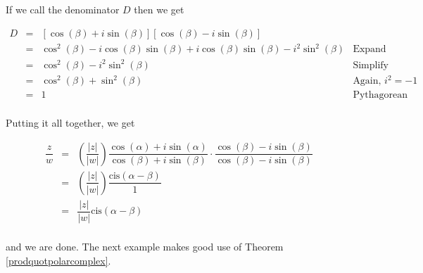 If we call the denominator $D$ then we get

\[ \begin{array}{rcll}
D & = & \left[\cos(\beta) + i\sin(\beta)\right]\left[\cos(\beta) - i\sin(\beta)\right] & \\ [3pt]
  & = & \cos^{2}(\beta) - i\cos(\beta)\sin(\beta) + i\cos(\beta)\sin(\beta) - i^2 \sin^{2}(\beta) & \text{Expand}  \\[3pt]
  & = & \cos^{2}(\beta) - i^2 \sin^{2}(\beta) & \text{Simplify}  \\[3pt]
	& = & \cos^{2}(\beta) + \sin^{2}(\beta) &  \text{Again, $i^{2} = -1$}\\[3pt]
	& = & 	1  & \text{Pythagorean Identity} \\ \end{array} \]
																																							 
Putting it all together, we get

\[ \begin{array}{rcll}

\dfrac{z}{w} & = & \left( \dfrac{|z|}{|w|}\right) \dfrac{\cos(\alpha) + i \sin(\alpha)}{\cos(\beta) + i \sin(\beta)} \cdot \dfrac{\cos(\beta) - i \sin(\beta)}{\cos(\beta) - i \sin(\beta)} & \\[8pt]
						 & = & \left( \dfrac{|z|}{|w|}\right) \dfrac{\text{cis}(\alpha - \beta)}{1}  &  \\ 	[8pt]	 
						 & = &  \dfrac{|z|}{|w|} \text{cis}(\alpha - \beta) \\ \end{array}\]

and we are done.  The next example makes good use of Theorem \ref{prodquotpolarcomplex}.

\pagebreak


